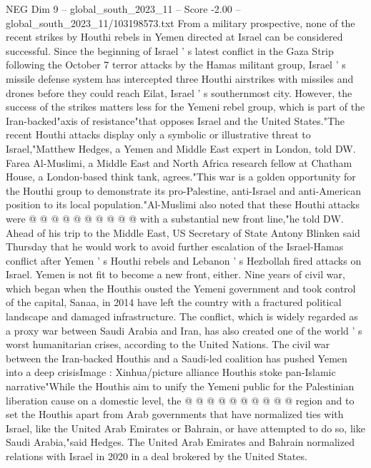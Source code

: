 \begin{textsample}{NEG Dim 9 – global\_south\_2023\_11 – Score -2.00 – global\_south\_2023\_11/103198573.txt}  \label{ex:f9_neg_426}
From a military prospective, none of the recent strikes by Houthi rebels in Yemen directed at Israel can be considered successful.
Since the beginning of Israel ' s latest conflict in the Gaza Strip following the October 7 terror attacks by the Hamas militant group, Israel ' s missile defense system has intercepted three Houthi airstrikes with missiles and drones before they could reach Eilat, Israel ' s southernmost city.
However, the success of the strikes matters less for the Yemeni rebel group, which is part of the Iran-backed"axis of resistance"that opposes Israel and the United States."The recent Houthi attacks display only a symbolic or illustrative threat to Israel,"Matthew Hedges, a Yemen and Middle East expert in London, told DW.
Farea Al-Muslimi, a Middle East and North Africa research fellow at Chatham House, a London-based think tank, agrees."This war is a golden opportunity for the Houthi group to demonstrate its pro-Palestine, anti-Israel and anti-American position to its local population."Al-Muslimi also noted that these Houthi attacks were @ @ @ @ @ @ @ @ @ @ with a substantial new front line,"he told DW.
Ahead of his trip to the Middle East, US Secretary of State Antony Blinken said Thursday that he would work to avoid further escalation of the Israel-Hamas conflict after Yemen ' s Houthi rebels and Lebanon ' s Hezbollah fired attacks on Israel.
Yemen is not fit to become a new front, either.
Nine years of civil war, which began when the Houthis ousted the Yemeni government and took control of the capital, Sanaa, in 2014 have left the country with a fractured political landscape and damaged infrastructure.
The conflict, which is widely regarded as a proxy war between Saudi Arabia and Iran, has also created one of the world ' s worst humanitarian crises, according to the United Nations.
The civil war between the Iran-backed Houthis and a Saudi-led coalition has pushed Yemen into a deep crisisImage : Xinhua/picture alliance Houthis stoke pan-Islamic narrative"While the Houthis aim to unify the Yemeni public for the Palestinian liberation cause on a domestic level, the @ @ @ @ @ @ @ @ @ @ region and to set the Houthis apart from Arab governments that have normalized ties with Israel, like the United Arab Emirates or Bahrain, or have attempted to do so, like Saudi Arabia,"said Hedges.
The United Arab Emirates and Bahrain normalized relations with Israel in 2020 in a deal brokered by the United States.

\end{textsample}
